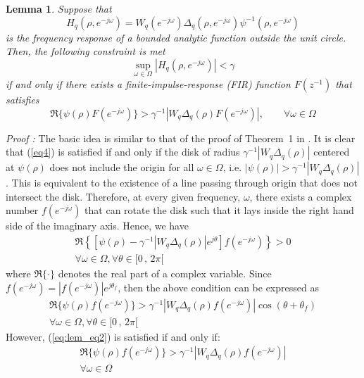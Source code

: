 \documentclass[journal]{IEEEtran}
\newtheorem{lemma}{Lemma}
\newcommand{\jo}{(e^{-j\omega})}
\begin{document}
\begin{lemma}   \label{lem2}
Suppose that $$H_q(\rho,e^{-j\omega})={W_q\jo \Delta_q(\rho,e^{-j\omega})} \psi^{-1}(\rho,e^{-j\omega})$$ is the frequency response of a bounded analytic function outside the unit circle. Then, the following constraint is met
\begin{equation} \label{eq4}
\sup_{\omega \in \Omega}  |H_q(\rho,e^{-j\omega})| < \gamma
\end{equation}
if and only if there exists a finite-impulse-response (FIR) function $F(z^{-1})$ that satisfies
$$
\Re\{\psi(\rho)F(e^{-j\omega})\}>\gamma ^{-1}|W_q\Delta_q(\rho)F(e^{-j\omega})|,  \qquad \forall \omega \in \Omega 
$$
\end{lemma}

{\it Proof :} 
The basic idea is similar to that of  the proof of Theorem~1 in \cite{RM94}. It is clear that (\ref{eq4}) is satisfied if and only if the disk of radius $ \gamma ^{-1}|W_q\Delta_q(\rho)|$ centered at $\psi(\rho)$ does not include the origin for all $\omega \in \Omega$, i.e. $|\psi(\rho)|>\gamma ^{-1}|W_q\Delta_q(\rho)|$. This is equivalent to the existence of a line passing through origin that does not intersect the disk. Therefore, at every given frequency, $\omega$, there exists a complex number $f(e^{-j\omega})$ that can rotate the disk such that it lays inside the right hand side of the imaginary axis. Hence, we have 
\begin{equation}
\label{eq:lem_eq1}
\begin{split}
\Re \left\{ \left[ \psi(\rho) - \gamma ^{-1}|W_q\Delta_q(\rho)|e^{j\theta} \right] f(e^{-j\omega}) \right\}>0 \\
\forall \omega \in \Omega, \forall \theta \in [0 \, , \, 2 \pi [
\end{split}
\end{equation}
where $\Re \{ \cdot \}$ denotes the real part of a complex variable. Since $f(e^{-j\omega}) = |f(e^{-j\omega})|e^{j\theta_f}$, then the above condition can be expressed as
\begin{equation}
\label{eq:lem_eq2}
\begin{split}
\Re\{  \psi(\rho)f(e^{-j\omega}) \}> \gamma ^{-1}|W_q\Delta_q(\rho)f(e^{-j\omega})|\cos(\theta + \theta_f) \\
\forall \omega \in \Omega, \forall \theta \in [0 \, , \, 2 \pi [
\end{split}
\end{equation}
However, (\ref{eq:lem_eq2}) is satisfied if and only if:
\begin{equation}
\label{eq18}
\begin{split}
\Re\{  \psi(\rho)f(e^{-j\omega}) \}> \gamma ^{-1}|W_q\Delta_q(\rho)f(e^{-j\omega})| \\
\forall \omega \in \Omega
\end{split}
\end{equation}
\end{document}
